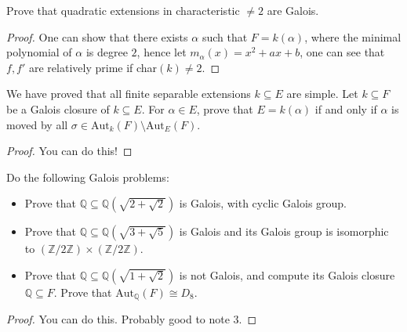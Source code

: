 \documentclass[openany]{book}
\begin{document}
\begin{prob}
Prove that quadratic extensions in characteristic $\neq 2$ are Galois.
\end{prob}
\begin{proof}
    One can show that there exists $\alpha$ such that $F=k(\alpha)$, where the minimal polynomial of $\alpha$ is degree $2$, hence let $m_\alpha(x)=x^2+ax+b$, one can see that $f,f'$ are relatively prime if char$(k)\neq 2$.
\end{proof}









\begin{prob}
We have proved that all finite separable extensions $k \subseteq E$ are simple. Let $k \subseteq F$ be a Galois closure of $k \subseteq E$. For $\alpha \in E$, prove that $E = k(\alpha)$ if and only if $\alpha$ is moved by all $\sigma \in \text{Aut}_k(F) \setminus \text{Aut}_E(F)$.
\end{prob}
\begin{proof}
    You can do this!
\end{proof}



\begin{prob}
    Do the following Galois problems:
\begin{itemize}
    \item Prove that $\mathbb{Q} \subseteq \mathbb{Q}(\sqrt{2 + \sqrt{2}})$ is Galois, with cyclic Galois group.
    \item Prove that $\mathbb{Q} \subseteq \mathbb{Q}(\sqrt{3 + \sqrt{5}})$ is Galois and its Galois group is isomorphic to $(\mathbb{Z}/2\mathbb{Z}) \times (\mathbb{Z}/2\mathbb{Z})$.
    \item Prove that $\mathbb{Q} \subseteq \mathbb{Q}(\sqrt{1 + \sqrt{2}})$ is not Galois, and compute its Galois closure $\mathbb{Q} \subseteq F$. Prove that $\text{Aut}_{\mathbb{Q}}(F) \cong D_8$.
\end{itemize}
\end{prob}
\begin{proof}
    You can do this. Probably good to note 3.
\end{proof}
\end{document}

